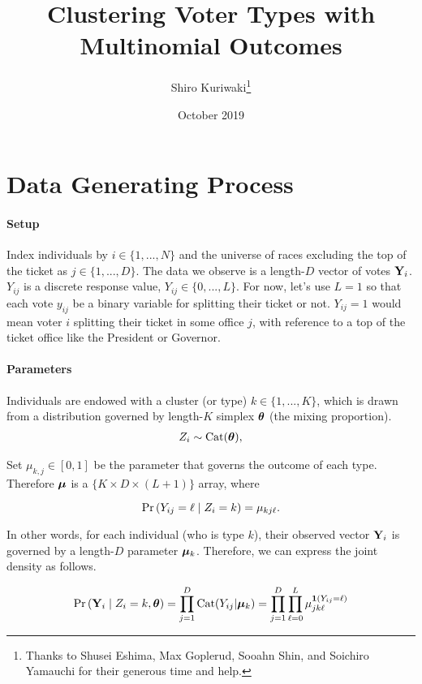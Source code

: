 \documentclass[11pt]{article}
\title{ \Large\textbf{Clustering Voter Types with Multinomial Outcomes}}
\author{\normalsize  Shiro Kuriwaki\thanks{Thanks to Shusei Eshima, Max Goplerud, Sooahn Shin, and Soichiro Yamauchi for their generous time and help.} }
\date{\normalsize October 2019}
\begin{document}
\maketitle

\onehalfspacing


\section{Data Generating Process}


\paragraph{Setup}

Index individuals by \(i \in \{1, ..., N\}\) and the universe of races
excluding the top of the ticket as \(j \in \{1, ..., D\}\). The data we
observe is a length-\(D\) vector of votes \(\mathbf{Y}_i\). \(Y_{ij}\) is a
discrete response value, \(Y_{ij} \in \{0, ..., L\}\). For now, let's use \(L = 1\) so that each vote \(y_{ij}\) be a binary variable for splitting their ticket or not. \(Y_{ij} = 1\) would mean voter \(i\) splitting their ticket in some office \(j\), with reference to a top of the ticket office like the President or Governor.


\paragraph{Parameters}


Individuals are endowed with a cluster (or type) \(k \in \{1, ..., K\}\), which is drawn from a distribution governed by length-\(K\) simplex \(\bm{\theta}\) (the mixing proportion).
\begin{align*}
Z_i \sim  \text{Cat}(\bm{\theta}),
\end{align*}

Set \(\mu_{k, j} \in [0, 1]\) be the parameter that governs the outcome of each type. Therefore \(\bm{\mu}\) is a \(\{K \times D \times (L + 1)\}\) array, where 

 \[\mathbb{\Pr}\left(Y_{ij} = \ell \mid Z_i = k\right) = \mu_{kj\ell}.\]

In other words, for each individual (who is  type \(k\)), their observed vector \(\mathbf{Y}_{i}\) is governed by a length-\(D\) parameter \(\bm{\mu}_{k}\). Therefore, we can express the joint density as follows. 

\begin{align}
\mathbb{\Pr}\left(\mathbf{Y}_{i} \mid Z_{i} = k, \bm{\theta}\right) = \prod^{D}_{j = 1} \text{Cat}(Y_{ij} | \bm{\mu}_k) = \prod^{D}_{j = 1}\prod^{L}_{\ell=0} \mu_{jk\ell}^{\bm{1}\left(Y_{ij} = \ell\right)}
\end{align}
\end{document}
